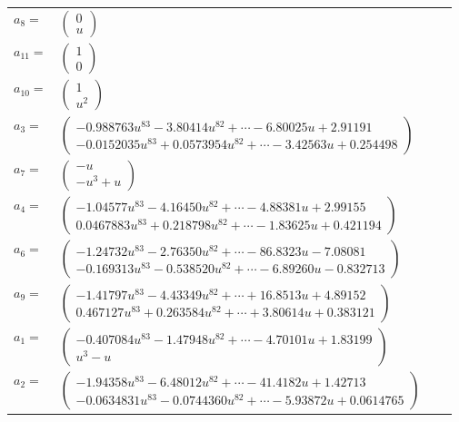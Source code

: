 \documentclass[1p]{elsarticle_modified}
\theoremstyle{definition}
\begin{document}
\begin{tabular}{m{7pt} m{180pt} m{7pt} m{180pt} }
\flushright $a_{8}=$&$\begin{pmatrix}0\\u\end{pmatrix}$ \\
\flushright $a_{11}=$&$\begin{pmatrix}1\\0\end{pmatrix}$ \\
\flushright $a_{10}=$&$\begin{pmatrix}1\\u^2\end{pmatrix}$ \\
\flushright $a_{3}=$&$\begin{pmatrix}-0.988763 u^{83}-3.80414 u^{82}+\cdots-6.80025 u+2.91191\\-0.0152035 u^{83}+0.0573954 u^{82}+\cdots-3.42563 u+0.254498\end{pmatrix}$ \\
\flushright $a_{7}=$&$\begin{pmatrix}- u\\- u^3+u\end{pmatrix}$ \\
\flushright $a_{4}=$&$\begin{pmatrix}-1.04577 u^{83}-4.16450 u^{82}+\cdots-4.88381 u+2.99155\\0.0467883 u^{83}+0.218798 u^{82}+\cdots-1.83625 u+0.421194\end{pmatrix}$ \\
\flushright $a_{6}=$&$\begin{pmatrix}-1.24732 u^{83}-2.76350 u^{82}+\cdots-86.8323 u-7.08081\\-0.169313 u^{83}-0.538520 u^{82}+\cdots-6.89260 u-0.832713\end{pmatrix}$ \\
\flushright $a_{9}=$&$\begin{pmatrix}-1.41797 u^{83}-4.43349 u^{82}+\cdots+16.8513 u+4.89152\\0.467127 u^{83}+0.263584 u^{82}+\cdots+3.80614 u+0.383121\end{pmatrix}$ \\
\flushright $a_{1}=$&$\begin{pmatrix}-0.407084 u^{83}-1.47948 u^{82}+\cdots-4.70101 u+1.83199\\u^3- u\end{pmatrix}$ \\
\flushright $a_{2}=$&$\begin{pmatrix}-1.94358 u^{83}-6.48012 u^{82}+\cdots-41.4182 u+1.42713\\-0.0634831 u^{83}-0.0744360 u^{82}+\cdots-5.93872 u+0.0614765\end{pmatrix}$ \\

\end{tabular}
\end{document}
